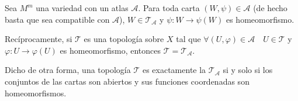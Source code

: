 \documentclass[\main/VD_completo.tex]{subfiles}
\begin{document}
\begin{lemma}[label={lem:caract-topnat-2}]
  Sea \(M^{m}\) una variedad con un atlas \(\mathcal{A}\).
  Para toda carta \((W,\psi) \in \mathcal{A}\) (de hecho basta que sea
  compatible con \(\mathcal{A}\)), \(W \in
  \mathcal{T}_{\mathcal{A}}\) y \(\psi \colon W \to \psi(W)\) es homeomorfismo.

  Recíprocamente, si \(\mathcal{T}\) es una topología sobre \(X\) tal que
  \(\forall (U,\varphi) \in \mathcal{A} \quad U \in \mathcal{T}\) y \(\varphi
  \colon U \to \varphi(U)\) es homeomorfismo, entonces \(\mathcal{T} =
  \mathcal{T}_{\mathcal{A}}\).

  Dicho de otra forma, una topología \(\mathcal{T}\) es exactamente la
   \(\mathcal{T}_{\mathcal{A}}\) si y solo si los conjuntos
  de las cartas son abiertos y sus funciones coordenadas son homeomorfismos.
\end{lemma}
\end{document}
